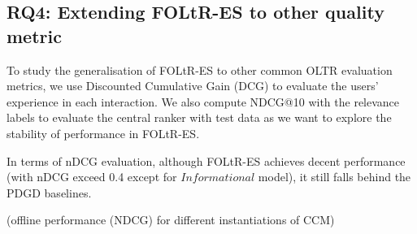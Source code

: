 %
%


\subsection{RQ4: Extending FOLtR-ES to other quality metric}


To study the generalisation of FOLtR-ES to other common OLTR evaluation metrics, we use Discounted Cumulative Gain (DCG) to evaluate the users' experience in each interaction. We also compute NDCG@10 with the relevance labels to evaluate the central ranker with test data as we want to explore the stability of  performance in FOLtR-ES.

In terms of nDCG evaluation, although FOLtR-ES achieves decent performance (with nDCG exceed 0.4 except for $Informational$ model), it still falls behind the PDGD baselines.



(offline performance (NDCG) for different instantiations of CCM)